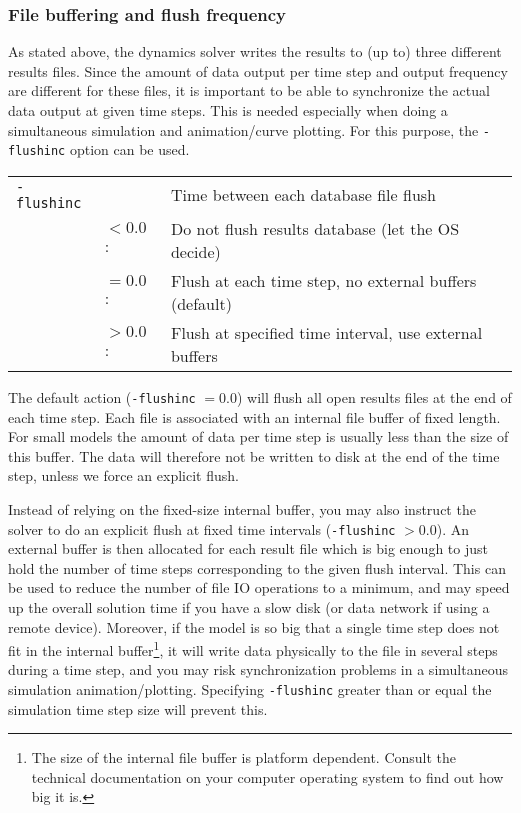 \subsubsection{File buffering and flush frequency}

As stated above, the dynamics solver writes the results to (up to) three
different results files. Since the amount of data output per time step and
output frequency are different for these files, it is important to be able to
synchronize the actual data output at given time steps. This is needed
especially when doing a simultaneous simulation and animation/curve plotting.
For this purpose, the {\tt-flushinc} option can be used.

\begin{tabular}{ m{14mm} m{10mm} m{85mm} }
{\tt-flushinc} & & Time between each database file flush \\
& $<0.0$ :     & Do not flush results database (let the OS decide) \\
& $=0.0$ :     & Flush at each time step, no external buffers (default) \\
& $>0.0$ :     & Flush at specified time interval, use external buffers
\end{tabular}

The default action ({\tt-flushinc} $=0.0$) will flush all open results files at
the end of each time step. Each file is associated with an internal file buffer
of fixed length. For small models the amount of data per time step is usually
less than the size of this buffer. The data will therefore not be written to
disk at the end of the time step, unless we force an explicit flush.

Instead of relying on the fixed-size internal buffer, you may also instruct the
solver to do an explicit flush at fixed time intervals ({\tt-flushinc} $>0.0$).
An external buffer is then allocated for each result file which is big enough to
just hold the number of time steps corresponding to the given flush interval.
This can be used to reduce the number of file IO operations to a minimum,
and may speed up the overall solution time if you have a slow disk
(or data network if using a remote device).
Moreover, if the model is so big that a single time step does not fit in the
internal buffer\footnote{
The size of the internal file buffer is platform dependent.
Consult the technical documentation on your computer operating system to find
out how big it is.}, it will write data physically to the file in several steps
during a time step, and you may risk synchronization problems in a simultaneous
simulation animation/plotting. Specifying {\tt-flushinc} greater than or equal
the simulation time step size will prevent this.

